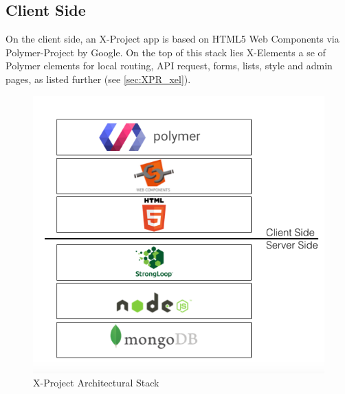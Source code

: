 \subsection{Client Side}
\label{subsec:XPR_arc_clie}

On the client side, an X-Project app is based on HTML5 Web Components via Polymer-Project by Google.
On the top of this stack lies X-Elements a se of Polymer elements for local routing, API request, forms, lists, style and admin pages, as listed further (see \ref{sec:XPR_xel}).


\begin {figure}[h]
\graphicspath{{images/chapter_xpr/}}
\includegraphics[width=\textwidth]{XPR_stack}
\caption{X-Project Architectural Stack }
\end {figure}